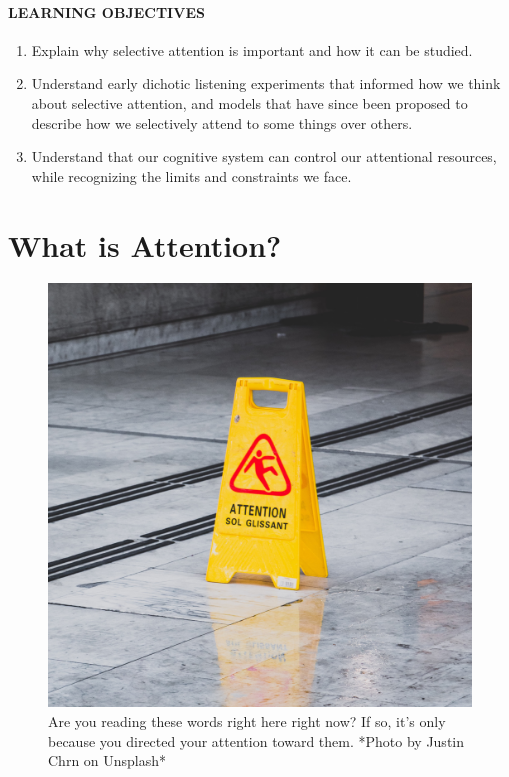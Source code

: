 \documentclass[
]{krantz}
\providecommand{\tightlist}{%
  \setlength{\itemsep}{0pt}\setlength{\parskip}{0pt}}
\begin{document}
\paragraph*{LEARNING OBJECTIVES}\label{learning-objectives-2}

\begin{enumerate}
\def\labelenumi{\arabic{enumi}.}
\tightlist
\item
  Explain why selective attention is important and how it can be studied.
\item
  Understand early dichotic listening experiments that informed how we think about selective attention, and models that have since been proposed to describe how we selectively attend to some things over others.
\item
  Understand that our cognitive system can control our attentional resources, while recognizing the limits and constraints we face.
\end{enumerate}

\section{What is Attention?}\label{what-is-attention}

\begin{figure}

{\centering \includegraphics[width=0.5\linewidth]{images/3_attention/attentionsign} 

}

\caption{Are you reading these words right here right now? If so, it’s only because you directed your attention toward them. *Photo by Justin Chrn on Unsplash*}\label{fig:attentionsign}
\end{figure}
\end{document}

